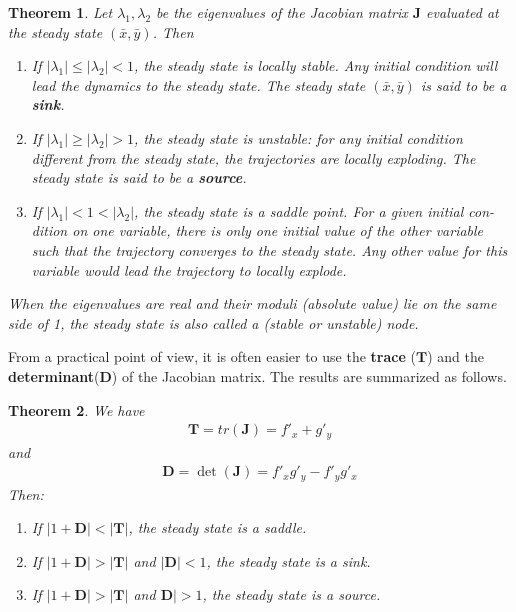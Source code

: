 \documentclass[11pt,a4paper]{book}
\newtheorem{theorem}{Theorem}[section]
\theoremstyle{definition}\newtheorem{definition}{Definition}
\theoremstyle{definition}\newtheorem{fact}{Fact}
\theoremstyle{definition}\newtheorem{remark}{Remark}
\theoremstyle{definition}\newtheorem{ex}{Ex.}
\theoremstyle{definition}\newtheorem{project}{Project}
\theoremstyle{definition}\newtheorem{problem}{Problem}
\theoremstyle{definition}\newtheorem{example}{Example}
\newenvironment{ftheorem}
{\begin{mdframed}\begin{theorem}}
		{\end{theorem}\end{mdframed}}
\numberwithin{theorem}{section}
\numberwithin{corollary}{chapter}
\numberwithin{assumption}{chapter}
\numberwithin{definition}{chapter}
\numberwithin{prop}{chapter}
\numberwithin{notation}{chapter}
\numberwithin{problem}{chapter}
\numberwithin{example}{chapter}
\numberwithin{fact}{chapter}
\numberwithin{ex}{chapter}
\def\D{\mathbf D}
\def\J{\mathbf J}
\def\T{\mathbf T}
\begin{document}
	\begin{ftheorem}
		Let $\lambda_1, \lambda_2$ be the eigenvalues of the Jacobian matrix $\J$ evaluated at the steady state $(\bar{x}, \bar{y})$. Then
		\begin{enumerate}
			\item If $|\lambda_1| \leq |\lambda_2| < 1$, the steady state is locally stable. Any initial condition will lead the dynamics to the steady state. The steady state $(\bar{x}, \bar{y})$ is said to be a \textbf{sink}.
			\item If $|\lambda_1| \geq |\lambda_2| > 1$, the steady state is unstable: for any initial condition different from the steady state, the trajectories are locally exploding. The steady state is said to be a \textbf{source}.
			\item If $|\lambda_1| < 1 < |\lambda_2| $, the steady state is a saddle point. For a given initial con- dition on one variable, there is only one initial value of the other variable such that the trajectory converges to the steady state. Any other value for this variable would lead the trajectory to locally explode.
		\end{enumerate}
		When the eigenvalues are real and their moduli (absolute value) lie on the same side of 1, the steady state is also called a (stable or unstable) \textit{node}.
	\end{ftheorem}
	
	From a practical point of view, it is often easier to use the \textbf{trace} ($\T$) and the \textbf{determinant}($\D$) of the Jacobian matrix. The results are summarized as follows.
	\begin{ftheorem}
		We have
		\begin{align*}
			\T = tr(\J) = f'_x + g'_y 
		\end{align*}
		and
		\begin{align*}
			  \D  = \det(\J)  =  f'_x g'_y - f'_y g'_x 
		\end{align*}
		Then:
		\begin{enumerate}
			\item If $| 1 + \D | < |\T|$, the steady state is a saddle. 
			\item If $|1+\D| > |\T|$ and $|\D| < 1$, the steady state is a sink.
			\item If $|1+\D| > |\T|$ and $\D| > 1$, the steady state is a source.
		\end{enumerate}
	\end{ftheorem} 
	
\end{document}
